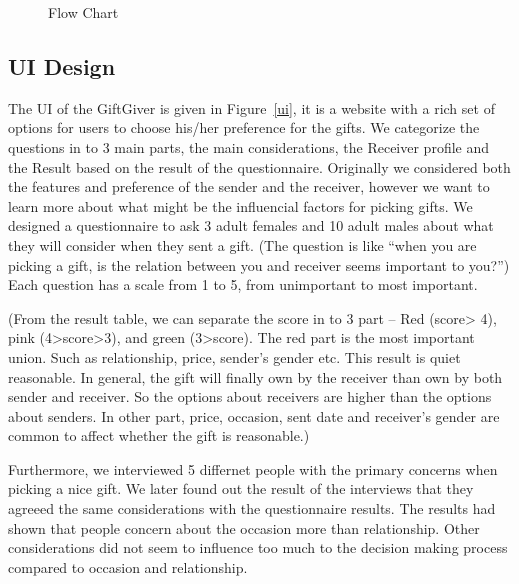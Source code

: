 \documentclass[11pt,twocolumn]{article}
\begin{document}
\begin{figure}[h!t]
\caption{Flow Chart}
\end{figure}


\subsection{UI Design}
The UI of the GiftGiver is given in Figure~\ref{ui}, it is a website with a rich set of options for users to choose his/her preference for the gifts. We categorize the questions in to 3 main parts, the main considerations, the Receiver profile and the Result based on the result of the questionnaire. Originally we considered both the features and preference of the sender and the receiver, however we want to learn more about what might be the influencial factors for picking gifts.  We designed a questionnaire to ask 3 adult females and 10 adult males about what they will consider when they sent a gift.
(The question is like “when you are picking a gift, is the relation between you and receiver seems important to you?”)   Each question has a scale from 1 to 5, from unimportant to most important.

(From the result table, we can separate the score in to 3 part – Red (score> 4), pink (4>score>3), and green (3>score).  The red part is the most important union.  Such as relationship, price, sender’s gender etc. This result is quiet reasonable.   In general, the gift will finally own by the receiver than own by both sender and receiver.   So the options about receivers are higher than the options about senders.  In other part, price, occasion, sent date and receiver’s gender are common to affect whether the gift is reasonable.)

Furthermore, we interviewed 5 differnet people with the primary concerns when picking a nice gift. We later found out the result of the interviews that they agreeed the same considerations with the questionnaire results. The results had shown that people  concern about the occasion more than relationship.  Other considerations did not seem to influence too much to the decision making process compared to occasion and relationship.
\end{document}
